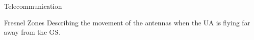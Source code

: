 \begin{frame}{Telecommunication}
  \begin{block}{Fresnel Zones}
      Describing the movement of the antennas when the UA is flying far away from the GS. 
    \end{block}

  \begin{figure}[H]
    \centerline{
    }
  \end{figure}
\end{frame}